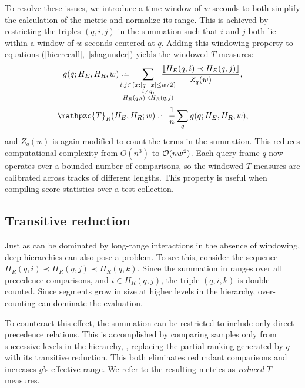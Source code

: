 \documentclass{article}
\def\shag{\ensuremath{\mathpzc{T}}}
\begin{document}
To resolve these issues, we introduce a time window of $w$ seconds to both simplify the 
calculation of the metric and normalize its range.  This is achieved by
restricting the triples $(q,i,j)$ in the summation such that $i$ and $j$ both lie within
a window of $w$ seconds centered at $q$.
Adding this windowing property to equations (\ref{hierrecall},~\ref{shagunder}) yields the windowed $T$-measures:
\begin{equation}
    g(q ; H_E, H_R, w) \defeq \hspace{-1.5em} \sum_{\substack{
        i, j \in \{x : |q-x| \leq w/2\}\\ 
  i \neq q,\\
  H_R(q, i) \prec H_R(q, j) }}
  \hspace{-2em} \frac{\ind{H_E(q, i) \prec H_E(q,
  j)}}{Z_q(w)},\label{windowrecall}
\end{equation}
\begin{equation}
\shag_R(H_E, H_R ; w) \defeq \frac{1}{n} \sum_q g(q ; H_E, H_R, w),
\end{equation}
and $Z_q(w)$ is again modified to count the terms in the summation.
This reduces computational complexity from $O(n^3)$ to $\mathcal{O}(nw^2)$.
Each query frame $q$ now operates over a bounded number of comparisons, 
so the windowed $T$-measures are calibrated across tracks of different lengths.
This property is useful when compiling score statistics over a test collection.


\subsection{Transitive reduction}
\label{sec:transitive}

Just as  can be dominated by long-range interactions in the absence of windowing, deep hierarchies can also pose a problem.
To see this, consider the sequence $H_R(q, i) \prec H_R(q, j) \prec H_R(q, k)$.
Since the summation in  ranges over all precedence comparisons, and $i \in H_R(q, j)$, the
triple $(q, i, k)$ is double-counted.
Since segments grow in size at higher levels in the hierarchy, over-counting can dominate the evaluation.

To counteract this effect, the summation can be restricted to include only direct precedence relations.
This is accomplished by comparing samples only from successive levels in the hierarchy, \ie, 
replacing the partial ranking generated by $q$ with its transitive reduction.
This both eliminates redundant comparisons and increases $g$'s effective range.
We refer to the resulting metrics as \emph{reduced} $T$-measures.
\end{document}
